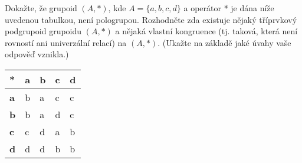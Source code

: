 Dokažte, že grupoid $(A, *)$, kde $A = \{a,b,c,d\}$ a
operátor * je dána níže uvedenou tabulkou, není pologrupou.
Rozhodněte zda existuje nějaký tříprvkový podgrupoid grupoidu $(A,
*)$ a nějaká vlastní kongruence (tj. taková, která není rovností ani
univerzální relací) na $(A, *)$. (Ukažte na základě jaké úvahy vaše
odpověď vznikla.)

\begin{table}[h]
\centering
\begin{tabular}{|l|l|l|l|l|}
\hline
*          & \textbf{a} & \textbf{b} & \textbf{c} & \textbf{d} \\ \hline
\textbf{a} & b          & a          & c          & c          \\ \hline
\textbf{b} & b          & a          & d          & c          \\ \hline
\textbf{c} & c          & d          & a          & b          \\ \hline
\textbf{d} & d          & d          & b          & b          \\ \hline
\end{tabular}
\end{table}
